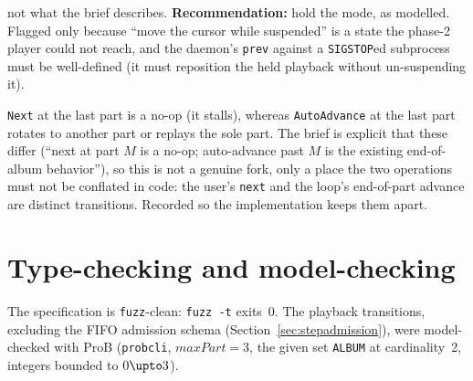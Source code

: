 \documentclass[a4paper,10pt,fleqn]{article}
\begin{document}
\begin{description}
    not what the brief describes. \textbf{Recommendation:} hold the mode, as
    modelled. Flagged only because ``move the cursor while suspended'' is a state
    the phase-2 player could not reach, and the daemon's \texttt{prev} against a
    \texttt{SIGSTOP}ed subprocess must be well-defined (it must reposition the
    held playback without un-suspending it).
  \item[Fork~C --- next at $M$ stalls; auto-advance at $M$ wraps.] \texttt{Next}
    at the last part is a no-op (it stalls), whereas \texttt{AutoAdvance} at the
    last part rotates to another part or replays the sole part. The brief is
    explicit that these differ (``next at part $M$ is a no-op; auto-advance past
    $M$ is the existing end-of-album behavior''), so this is not a genuine fork,
    only a place the two operations must not be conflated in code: the user's
    \texttt{next} and the loop's end-of-part advance are distinct transitions.
    Recorded so the implementation keeps them apart.
\end{description}

\section{Type-checking and model-checking}
\label{sec:results}

The specification is \texttt{fuzz}-clean: \texttt{fuzz -t} exits~0. The
playback transitions, excluding the FIFO admission schema
(Section~\ref{sec:stepadmission}), were model-checked with ProB
(\texttt{probcli}, $maxPart = 3$, the given set
\texttt{ALBUM} at cardinality~2, integers bounded to $0 \upto 3$).
\end{document}

